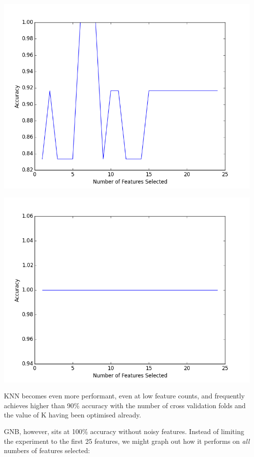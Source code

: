 \documentclass{tufte-handout}
\begin{document}
\includegraphics[width=\textwidth{},keepaspectratio]{knn_optimal_features.png}

\includegraphics[width=\textwidth{},keepaspectratio]{gnb_optimal_features.png}

KNN becomes even more performant, even at low feature counts, and frequently achieves higher than 90\% accuracy with the number of cross validation folds and the value of K having been optimised already.\par

GNB, however, sits at 100\% accuracy without noisy features. Instead of limiting the experiment to the first 25 features, we might graph out how it performs on \emph{all} numbers of features selected:
\end{document}
